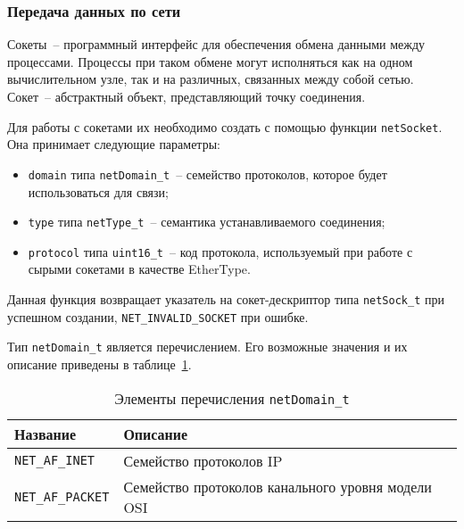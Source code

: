\subsubsection{Передача данных по сети}

Сокеты~-- программный интерфейс для обеспечения обмена данными между процессами. Процессы при таком обмене могут исполняться как на одном вычислительном узле, так и на различных, связанных между собой сетью. Сокет~-- абстрактный объект, представляющий точку соединения.

Для работы с сокетами их необходимо создать с помощью функции \lstinline{netSocket}.
Она принимает следующие параметры:

\begin{itemize}
    \item \lstinline{domain} типа \lstinline{netDomain_t}~-- семейство протоколов,
    которое будет использоваться для связи;
    \item \lstinline{type} типа \lstinline{netType_t}~-- семантика устанавливаемого соединения;
    \item \lstinline{protocol} типа \lstinline{uint16_t}~-- код протокола, используемый при работе с сырыми сокетами в качестве EtherType.
\end{itemize}

Данная функция возвращает указатель на сокет-дескриптор типа \lstinline{netSock_t} при успешном создании, \lstinline{NET_INVALID_SOCKET} при ошибке.

Тип \lstinline{netDomain_t} является перечислением. Его возможные значения
и их описание приведены в таблице~\ref{table:func:netDomain}.

\begin{table}[ht]
    \caption{Элементы перечисления \lstinline{netDomain_t}}
    \label{table:func:netDomain}
    \begin{tabular}{| >{\raggedright}m{}
                    | >{\raggedright\arraybackslash}m{}|}
        \hline
        \centering Название & \centering\arraybackslash Описание \\

        \hline
        \lstinline[]$NET_AF_INET$ &
        Семейство протоколов IP
        \\

        \hline
        \lstinline[]$NET_AF_PACKET$ &
        Семейство протоколов канального уровня модели OSI
        \\

        \hline
    \end{tabular}
\end{table}

